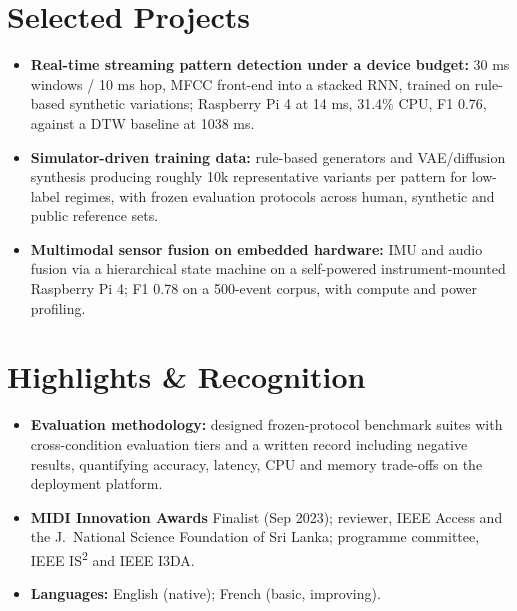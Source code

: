 \documentclass[11pt]{article}
\begin{document}
\section*{Selected Projects \footnotesize {}}
\begin{itemize}[leftmargin=1.2em, itemsep=-0.25em]
    \item \textbf{Real-time streaming pattern detection under a device budget:} 30 ms windows / 10 ms hop, MFCC front-end into a stacked RNN, trained on rule-based synthetic variations; Raspberry Pi 4 at 14 ms, 31.4\% CPU, F1 0.76, against a DTW baseline at 1038 ms.
    \item \textbf{Simulator-driven training data:} rule-based generators and VAE/diffusion synthesis producing roughly 10k representative variants per pattern for low-label regimes, with frozen evaluation protocols across human, synthetic and public reference sets.
    \item \textbf{Multimodal sensor fusion on embedded hardware:} IMU and audio fusion via a hierarchical state machine on a self-powered instrument-mounted Raspberry Pi 4; F1 0.78 on a 500-event corpus, with compute and power profiling.
\end{itemize}

\vspace{-0.5em}
\enlargethispage{5\baselineskip}
\section*{Highlights \& Recognition}
\begin{itemize}[leftmargin=1.2em, itemsep=-0.25em]
    \item \textbf{Evaluation methodology:} designed frozen-protocol benchmark suites with cross-condition evaluation tiers and a written record including negative results, quantifying accuracy, latency, CPU and memory trade-offs on the deployment platform.
    \item \textbf{MIDI Innovation Awards} Finalist (Sep 2023); reviewer, IEEE Access and the J.\ National Science Foundation of Sri Lanka; programme committee, IEEE IS\textsuperscript{2} and IEEE I3DA.
    \item \textbf{Languages:} English (native); French (basic, improving).
\end{itemize}
\end{document}
